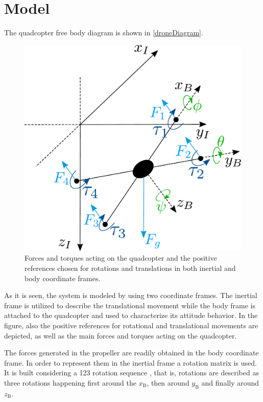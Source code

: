 \section{Model}
The quadcopter free body diagram is shown in \autoref{droneDiagram}. 
\begin{figure}[H]
	\centering
	\includegraphics[scale=0.25]{figures/droneDiagram}
	\caption{Forces and torques acting on the quadcopter and the positive references chosen for rotations and translations in both inertial and body coordinate frames.}
	\label{droneDiagram}
\end{figure}
%
As it is seen, the system is modeled by using two coordinate frames. The inertial frame is utilized to describe the translational movement while the body frame is attached to the quadcopter and used to characterize its attitude behavior. In the figure, also the positive references for rotational and translational movements are depicted, as well as the main forces and torques acting on the quadcopter. 

The forces generated in the propeller are readily obtained in the body coordinate frame. In order to represent them in the inertial frame a rotation matrix is used. It is built considering a 123 rotation sequence \cite{rotationmatrix}, that is, rotations are described as three rotations happening first around the $x_\mathrm{B}$, then around  $y_\mathrm{B}$ and finally around $z_\mathrm{B}$.
 
